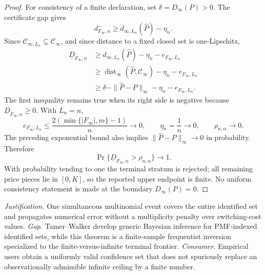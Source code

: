 \documentclass{article}
\begin{document}
\begin{proof}
For consistency of a finite declaration, set \(\delta=D_\infty(P)>0\).  The certificate gap gives
\[
 d^-_{F_\infty,n}
 \ge d_{\infty,L_n}(\widehat P)-\eta_n.
\]
Since \(\mathcal C_{\infty,L_n}\subseteq\mathcal C_\infty\), and since distance to a fixed closed set is one-Lipschitz,
\[
 \begin{aligned}
 \underline D_{F_\infty,n}
 &\ge d_{\infty,L_n}(\widehat P)-\eta_n-e_{F_\infty,L_n}\\
 &\ge\operatorname{dist}_\infty(\widehat P,\mathcal C_\infty)
       -\eta_n-e_{F_\infty,L_n}\\
 &\ge\delta-\|\widehat P-P\|_\infty
       -\eta_n-e_{F_\infty,L_n}.
 \end{aligned}
\]
The first inequality remains true when its right side is negative because \(\underline D_{F_\infty,n}\ge0\).  With \(L_n=n\),
\[
 e_{F_\infty,L_n}
 \le\frac{2(\min\{|F_\infty|,m\}-1)}{n}\longrightarrow0,
 \qquad
 \eta_n=\frac1n\longrightarrow0,
 \qquad
 \rho_{n,\alpha}\longrightarrow0.
\]
The preceding exponential bound also implies \(\|\widehat P-P\|_\infty\to0\) in probability.  Therefore
\[
 \Pr\{\underline D_{F_\infty,n}>\rho_{n,\alpha}\}\longrightarrow1.
\]
With probability tending to one the terminal stratum is rejected; all remaining price pieces lie in \([0,K]\), so the reported upper endpoint is finite.  No uniform consistency statement is made at the boundary \(D_\infty(P)=0\).
\end{proof}
\par\smallskip\noindent \textit{Justification.} One simultaneous multinomial event covers the entire identified set and propagates numerical error without a multiplicity penalty over switching-cost values. \textit{Gap.} Tamer--Walker develop generic Bayesian inference for PMF-indexed identified sets, while this theorem is a finite-sample frequentist inversion specialized to the finite-versus-infinite terminal frontier. \textit{Consumer.} Empirical users obtain a uniformly valid confidence set that does not spuriously replace an observationally admissible infinite ceiling by a finite number.
\end{document}
